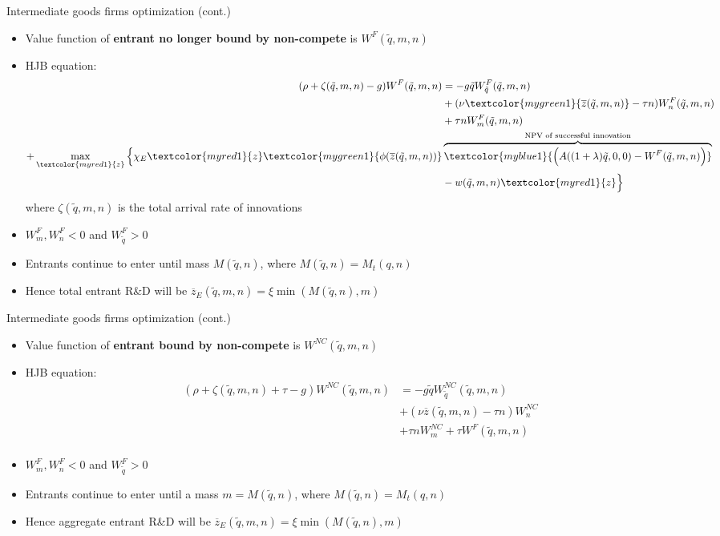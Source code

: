 \documentclass[english,usenames,dvipsnames]{beamer}
\begin{document}
\begin{frame}{Intermediate goods firms optimization (cont.)}
\begin{itemize}
	\small
	\item Value function of \textbf{entrant no longer bound by non-compete} is $W^{F}(\tilde{q},m,n)$
	\item HJB equation:
	\small
	\begin{align*}
	(\rho + \zeta(\tilde{q},m,n) - g)W^F(\tilde{q},m,n) &= - g\tilde{q}W^F_{\tilde{q}}(\tilde{q},m,n) \\ &+ (\nu \textcolor{mygreen1}{\overline{z}(\tilde{q},m,n)} - \tau n)W_n^F(\tilde{q},m,n) \\
	 & + \tau n W_m ^F (\tilde{q},m,n) \\ + \max_{\textcolor{myred1}{z}} \Big\{\chi_E\textcolor{myred1}{z}\textcolor{mygreen1}{\phi(\overline{z}(\tilde{q},m,n))} & \overbrace{\textcolor{myblue1}{\Big(A((1+\lambda)\tilde{q},0,0)-W^F(\tilde{q},m,n)\Big)}}^{\text{NPV of successful innovation}} \\
	& - w(\tilde{q},m,n)\textcolor{myred1}{z} \Big\} \\
	\end{align*}
	where $\zeta(\tilde{q},m,n)$ is the total arrival rate of innovations 
	\small
	\item $W^F_m,W^F_n<0$ and $W^F_{\tilde{q}} > 0$ 
	\item Entrants continue to enter until mass $M(\tilde{q},n)$, where $M(\tilde{q},n) = M_t(q,n)$
	\item Hence total entrant R\&D will be $\overline{z}_E(\tilde{q},m,n) = \xi \min (M(\tilde{q},n),m)$
\end{itemize}
\end{frame}

\begin{frame}{Intermediate goods firms optimization (cont.)}
\begin{itemize}
	\item Value function of \textbf{entrant bound by non-compete} is $W^{NC}(\tilde{q},m,n)$
	\item HJB equation:
	\small
	\begin{align*}
	(\rho + \zeta(\tilde{q},m,n) + \tau - g)W^{NC}(\tilde{q},m,n) &= - g\tilde{q}W^{NC}_{\tilde{q}}(\tilde{q},m,n) \\
	& + (\nu \overline{z}(\tilde{q},m,n)-\tau n)W_n^{NC}	\\
	& + \tau n W_m^{NC} + \tau W^F(\tilde{q},m,n) \\ 
	\end{align*}
	\small
	\item $W^F_m,W^F_n<0$ and $W^F_{\tilde{q}} > 0$ 
	\item Entrants continue to enter until a mass $m = M(\tilde{q},n)$, where $M(\tilde{q},n) = M_t(q,n)$
	\item Hence aggregate entrant R\&D will be $\overline{z}_E(\tilde{q},m,n) = \xi \min (M(\tilde{q},n),m)$
\end{itemize}
\end{frame}
\end{document}
